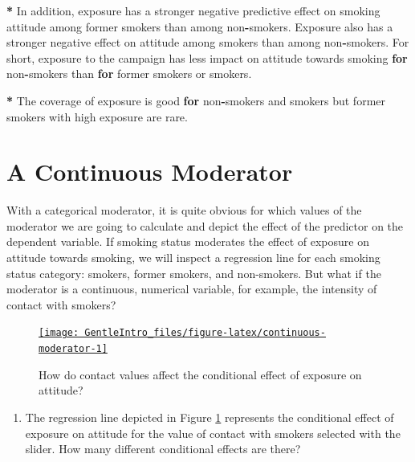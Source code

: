 \documentclass[a4paper]{book}
\newenvironment{Shaded}{\begin{snugshade}}{\end{snugshade}}
\newcommand{\StringTok}[1]{\textcolor[rgb]{0.00,0.00,0.00}{#1}}
\newcommand{\ControlFlowTok}[1]{\textcolor[rgb]{0.00,0.00,0.00}{\textbf{#1}}}
\newcommand{\OperatorTok}[1]{\textcolor[rgb]{0.00,0.00,0.00}{\textbf{#1}}}
\newcommand{\NormalTok}[1]{#1}
\providecommand{\tightlist}{%
  \setlength{\itemsep}{0pt}\setlength{\parskip}{0pt}}
\theoremstyle{definition}
\theoremstyle{definition}
\theoremstyle{definition}
\theoremstyle{remark}
\begin{document}
\begin{Shaded}
\begin{Highlighting}[]
\OperatorTok{*}\StringTok{ }\NormalTok{In addition, exposure has a stronger negative predictive effect on smoking}
\NormalTok{attitude among former smokers than among non}\OperatorTok{-}\NormalTok{smokers. Exposure also has a}
\NormalTok{stronger negative effect on attitude among smokers than among non}\OperatorTok{-}\NormalTok{smokers. For}
\NormalTok{short, exposure to the campaign has less impact on attitude towards smoking}
\ControlFlowTok{for}\NormalTok{ non}\OperatorTok{-}\NormalTok{smokers than }\ControlFlowTok{for}\NormalTok{ former smokers or smokers.}
  
\OperatorTok{*}\StringTok{ }\NormalTok{The coverage of exposure is good }\ControlFlowTok{for}\NormalTok{ non}\OperatorTok{-}\NormalTok{smokers and smokers but former}
\NormalTok{smokers with high exposure are rare.}
\end{Highlighting}
\end{Shaded}

\section{A Continuous Moderator}\label{cont-moderator-regression}

With a categorical moderator, it is quite obvious for which values of
the moderator we are going to calculate and depict the effect of the
predictor on the dependent variable. If smoking status moderates the
effect of exposure on attitude towards smoking, we will inspect a
regression line for each smoking status category: smokers, former
smokers, and non-smokers. But what if the moderator is a continuous,
numerical variable, for example, the intensity of contact with smokers?

\begin{figure}[H]
\href{http://82.196.4.233:3838/apps/continuous-moderator/}{\texttt{[image: GentleIntro\_files/figure-latex/continuous-moderator-1]} }\caption{How do contact values affect the conditional effect of exposure on attitude?}\label{fig:continuous-moderator}
\end{figure}

\begin{enumerate}
\def\labelenumi{\arabic{enumi}.}
\tightlist
\item
  The regression line depicted in Figure \ref{fig:continuous-moderator}
  represents the conditional effect of exposure on attitude for the
  value of contact with smokers selected with the slider. How many
  different conditional effects are there?
\end{enumerate}
\end{document}
